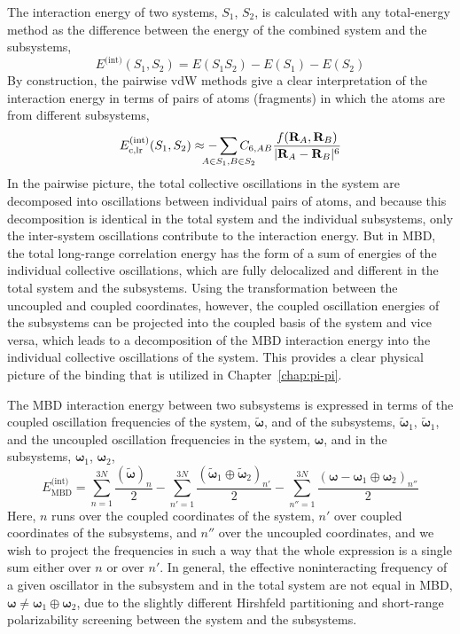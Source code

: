 The interaction energy of two systems, $S_1$, $S_2$, is calculated with any total-energy method as the difference between the energy of the combined system and the subsystems,
\begin{equation}
  E^\text{(int)}(S_1,S_2)=E(S_1S_2)-E(S_1)-E(S_2)
\end{equation}
By construction, the pairwise vdW methods give a clear interpretation of the interaction energy in terms of pairs of atoms (fragments) in which the atoms are from different subsystems,
\begin{equation}
  E_\text{c,lr}^\text{(int)}(S_1,S_2)\approx-\sum_{\mathclap{A\in S_1,B\in S_2}}C_{6,{AB}}\frac{f(\mathbf R_A,\mathbf R_B)}{|\mathbf R_A-\mathbf R_B|^6}
\end{equation}
In the pairwise picture, the total collective oscillations in the system are decomposed into oscillations between individual pairs of atoms, and because this decomposition is identical in the total system and the individual subsystems, only the inter-system oscillations contribute to the interaction energy.
But in MBD, the total long-range correlation energy has the form of a sum of energies of the individual collective oscillations, which are fully delocalized and different in the total system and the subsystems.
Using the transformation between the uncoupled and coupled coordinates, however, the coupled oscillation energies of the subsystems can be projected into the coupled basis of the system and vice versa, which leads to a decomposition of the MBD interaction energy into the individual collective oscillations of the system.
This provides a clear physical picture of the binding that is utilized in Chapter~\ref{chap:pi-pi}.

The MBD interaction energy between two subsystems is expressed in terms of the coupled oscillation frequencies of the system, $\tilde{\boldsymbol\omega}$, and of the subsystems, $\tilde{\boldsymbol\omega}_1$, $\tilde{\boldsymbol\omega}_1$, and the uncoupled oscillation frequencies in the system, $\boldsymbol\omega$, and in the subsystems, $\boldsymbol\omega_1$, $\boldsymbol\omega_2$,
\begin{equation}
  E_\text{MBD}^\text{(int)}=\sum_{n=1}^{3N}\frac{(\tilde{\boldsymbol\omega})_n}2-\sum_{n'=1}^{3N}\frac{(\tilde{\boldsymbol\omega}_1\oplus\tilde{\boldsymbol\omega}_2)_{n'}}2
	-\sum_{n''=1}^{3N}\frac{({\boldsymbol\omega}-{\boldsymbol\omega}_1\oplus{\boldsymbol\omega_2})_{n''}}2
	\label{eq:mbd-int}
\end{equation}
Here, $n$ runs over the coupled coordinates of the system, $n'$ over coupled coordinates of the subsystems, and $n''$ over the uncoupled coordinates, and we wish to project the frequencies in such a way that the whole expression is a single sum either over $n$ or over $n'$.
In general, the effective noninteracting frequency of a given oscillator in the subsystem and in the total system are not equal in MBD, $\boldsymbol\omega\neq\boldsymbol\omega_1\oplus\boldsymbol\omega_2$, due to the slightly different Hirshfeld partitioning and short-range polarizability screening between the system and the subsystems.

